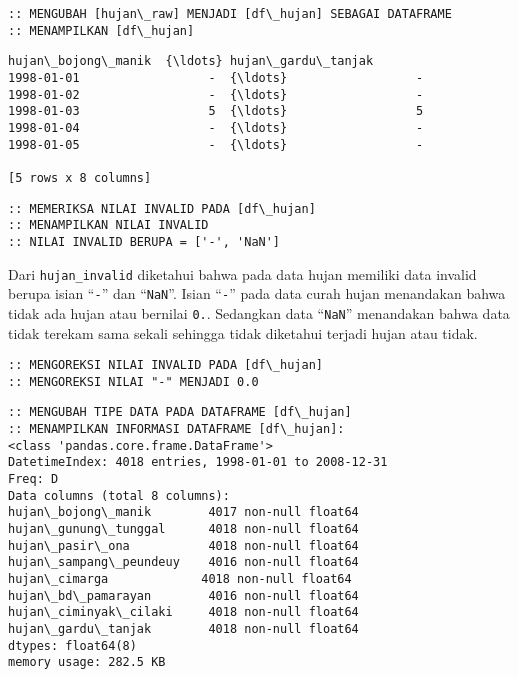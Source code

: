 \documentclass[11pt]{article}
\makeatletter
\newcommand{\boxspacing}{\kern\kvtcb@left@rule\kern\kvtcb@boxsep}
\newcommand{\prompt}[4]{
        \ttfamily\llap{{\color{#2}[#3]:\hspace{3pt}#4}}\vspace{-\baselineskip}
    }
\makeatother
\begin{document}
    \begin{Verbatim}[commandchars=\\\{\}]
:: MENGUBAH [hujan\_raw] MENJADI [df\_hujan] SEBAGAI DATAFRAME
:: MENAMPILKAN [df\_hujan]
    \end{Verbatim}

            \begin{tcolorbox}[breakable, size=fbox, boxrule=.5pt, pad at break*=1mm, opacityfill=0]
\prompt{Out}{outcolor}{0}{\boxspacing}
\begin{Verbatim}[commandchars=\\\{\}]
           hujan\_bojong\_manik  {\ldots} hujan\_gardu\_tanjak
1998-01-01                  -  {\ldots}                  -
1998-01-02                  -  {\ldots}                  -
1998-01-03                  5  {\ldots}                  5
1998-01-04                  -  {\ldots}                  -
1998-01-05                  -  {\ldots}                  -

[5 rows x 8 columns]
\end{Verbatim}
\end{tcolorbox}
        
    \begin{Verbatim}[commandchars=\\\{\}]
:: MEMERIKSA NILAI INVALID PADA [df\_hujan]
:: MENAMPILKAN NILAI INVALID
:: NILAI INVALID BERUPA = ['-', 'NaN']
    \end{Verbatim}

    Dari \texttt{hujan\_invalid} diketahui bahwa pada data hujan memiliki
data invalid berupa isian ``\texttt{-}'' dan ``\texttt{NaN}''. Isian
``\texttt{-}'' pada data curah hujan menandakan bahwa tidak ada hujan
atau bernilai \texttt{0.}. Sedangkan data ``\texttt{NaN}'' menandakan
bahwa data tidak terekam sama sekali sehingga tidak diketahui terjadi
hujan atau tidak.

    \begin{Verbatim}[commandchars=\\\{\}]
:: MENGOREKSI NILAI INVALID PADA [df\_hujan]
:: MENGOREKSI NILAI "-" MENJADI 0.0
    \end{Verbatim}

    \begin{Verbatim}[commandchars=\\\{\}]
:: MENGUBAH TIPE DATA PADA DATAFRAME [df\_hujan]
:: MENAMPILKAN INFORMASI DATAFRAME [df\_hujan]:
<class 'pandas.core.frame.DataFrame'>
DatetimeIndex: 4018 entries, 1998-01-01 to 2008-12-31
Freq: D
Data columns (total 8 columns):
hujan\_bojong\_manik        4017 non-null float64
hujan\_gunung\_tunggal      4018 non-null float64
hujan\_pasir\_ona           4018 non-null float64
hujan\_sampang\_peundeuy    4016 non-null float64
hujan\_cimarga             4018 non-null float64
hujan\_bd\_pamarayan        4016 non-null float64
hujan\_ciminyak\_cilaki     4018 non-null float64
hujan\_gardu\_tanjak        4018 non-null float64
dtypes: float64(8)
memory usage: 282.5 KB
    \end{Verbatim}
\end{document}
